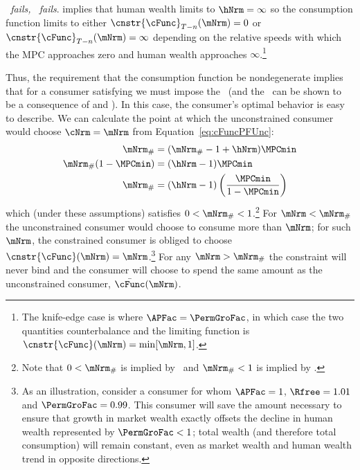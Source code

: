 \documentclass[\econtexRoot/BufferStockTheory]{subfiles}
\begin{document}
\hypertarget{cnclGICRawcnclRICcnclFHWC}{}

\textit{{\RIC}~fails, {\FHWC}~fails}.
{\cncl{\FHWC}} implies that human wealth limits to $\hNrm =
\infty$ so the consumption function limits to either
$\cnstr{\cFunc}_{T-n}(\mNrm) = 0$ or
$\cnstr{\cFunc}_{T-n}(\mNrm) = \infty$ depending on the relative
speeds with which the MPC approaches zero and human wealth approaches
$\infty$.\footnote{The knife-edge case is where $\APFac = \PermGroFac$, in
  which case the two quantities counterbalance and the limiting
  function is $\cnstr{\cFunc}(\mNrm)=\min[\mNrm,1]$.}

\let\TableWidth\relax
{\newlength\TableWidth}

Thus, the requirement that the consumption function be nondegenerate
implies that for a consumer satisfying \cncl{\GICRaw} we must impose
the \RIC~(and the \FHWC~can be shown to be a consequence of \cncl{\GICRaw} and \RIC).
In
this case, the consumer's optimal behavior is easy to describe.
We
can calculate the point at which the unconstrained consumer would
choose $\cNrm = \mNrm$ from Equation~\eqref{eq:cFuncPFUnc}:
\begin{equation}\begin{gathered}\begin{aligned}
  \mNrm_{\#}  & = (\mNrm_{\#}-1+\hNrm)\MPCmin
  \\ \mNrm_{\#}(1-\MPCmin)  & = (\hNrm - 1)\MPCmin
  \\ \mNrm_{\#}  & = (\hNrm - 1)\left(\frac{\MPCmin}{1-\MPCmin}\right)
\end{aligned}\end{gathered}\end{equation}
which (under these assumptions) satisfies $0 < \mNrm_{\#} < 1$.\footnote{Note that $0 < \mNrm_{\#}$ is implied by \RIC~and $ \mNrm_{\#}<1$ is implied by \cncl{\GICRaw}.}
For
$\mNrm < \mNrm_{\#}$ the unconstrained consumer would choose to
consume more than $\mNrm$; for such $\mNrm$, the constrained consumer
is obliged to choose $\cnstr{\cFunc}(\mNrm) = \mNrm$.\footnote{As an
  illustration, consider a consumer for whom $\APFac = 1$, $\Rfree
  =1.01$ and $\PermGroFac = 0.99$.
This consumer will save the amount
  necessary to ensure that growth in market wealth exactly offsets the
  decline in human wealth represented by $\PermGroFac < 1$; total wealth
  (and therefore total consumption) will remain constant, even as
  market wealth and human wealth trend in opposite directions.}
For
any $\mNrm > \mNrm_{\#}$ the constraint will never bind and the
consumer will choose to spend the same amount as the unconstrained
consumer, $\bar{\cFunc}(\mNrm)$.
\end{document}
